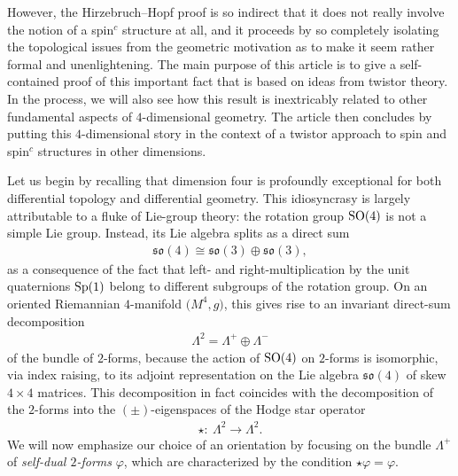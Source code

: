 \documentclass[pdftex]{sigma}
\numberwithin{equation}{section}
\begin{document}
 However, the Hirzebruch--Hopf proof is so indirect that it does not really involve the notion of a spin$^c$ structure at all, and it
 proceeds by so completely isolating
 the topological issues from
 the geometric motivation as to make it seem rather formal and
 unenlightening. The main purpose of this article is to give a self-contained
 proof of this important fact that is based on ideas from twistor theory. In the process, we will also see how this result is inextricably related to other fundamental aspects of $4$-dimensional geometry. The article then concludes by putting this $4$-dimensional story in the context of a twistor approach to spin and spin$^c$ structures in other dimensions.

 Let us begin by recalling
 that dimension four is profoundly exceptional for both differential topology and differential geometry.
 This idiosyncrasy is largely attributable to a fluke of Lie-group theory:
 the rotation group ${\rm SO}(4)$ is not a simple Lie group. Instead, its Lie algebra splits as a direct sum
 \begin{gather*}
{\mathfrak{so}}(4) \cong {\mathfrak{so}}(3)\oplus
 {\mathfrak{so}} (3),
\end{gather*}
 as a consequence of the fact that left- and right-multiplication by the unit quaternions ${\rm Sp}(1)$ belong to
 different subgroups of the rotation group. On an oriented Riemannian $4$-manifold $\big(M^4, g\big)$, this gives rise
 to an invariant direct-sum decomposition
\begin{gather*}
\Lambda^2 = \Lambda^+ \oplus \Lambda^-
\end{gather*}
of the bundle of $2$-forms, because the action of ${\rm SO}(4)$ on $2$-forms is isomorphic, via index raising, to
its adjoint representation on the Lie algebra ${\mathfrak{so}}(4)$ of skew $4\times 4$ matrices. This decomposition
in fact coincides with the decomposition of the $2$-forms into the $(\pm)$-eigenspaces of the Hodge star operator
\begin{gather*}
\star\colon \ \Lambda^2 \to \Lambda^2.
\end{gather*}
We will now emphasize our choice of an orientation by focusing on the bundle $\Lambda^+$ of
{\em self-dual $2$-forms} $\varphi$, which are characterized by the condition $\star \varphi = \varphi$.
\end{document}
